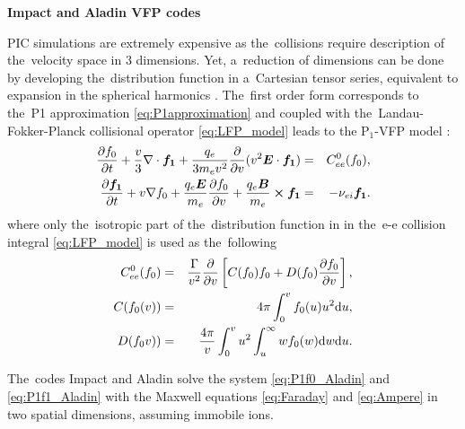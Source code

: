 \textbf{Impact and Aladin VFP codes}

PIC simulations are extremely expensive as the~collisions require description 
of the~velocity space in 3 dimensions. Yet, a~reduction of dimensions can be 
done by developing the~distribution function in a~Cartesian tensor series, 
equivalent to expansion in the spherical harmonics \cite{Johnston_PR1960}.
The~first order form corresponds to the~P1 approximation 
\eqref{eq:P1approximation} and coupled with
the~Landau-Fokker-Planck collisional operator 
\eqref{eq:LFP_model} leads to the P$_1$-VFP model 
\cite{Johnston_PR1960, Kingham_JCP2004}:
\begin{eqnarray}
\frac{\partial f_0}{\partial t}+\frac{v}{3}\nabla \cdot {\boldsymbol{f_1}}
+\frac{q_e}{3m_ev^2}\frac{\partial}{\partial v}(v^2\boldsymbol{E}\cdot {\boldsymbol{f_1}})
&=&
C^0_{ee}(f_0) ,
 \label{eq:P1f0_Aladin}\\
\frac{\partial {\boldsymbol{f_1}}}{\partial t}+v\nabla f_0
+ \frac{q_e\boldsymbol{E}}{m_e}\frac{\partial f_0}{\partial v}
+\frac{q_e\boldsymbol{B}}{m_e}\boldsymbol{\times} {\boldsymbol{f_1}} 
&=&
- \nu_{ei}{\boldsymbol{f_1}} .
\label{eq:P1f1_Aladin}
\end{eqnarray}
where only the~isotropic part of the~distribution function in 
in the~e-e collision integral \eqref{eq:LFP_model} is used as the~following
\begin{eqnarray} 
C^0_{ee}(f_0) &=& \frac{\Gamma}{v^2}\frac{\partial}{\partial v}
\left[C(f_0)f_0+D(f_0)\frac{\partial f_0}{\partial v}\right] ,
\label{eq:C0_collision_operator}
\\
C(f_0(v)) &=& 4\pi\int_0^v f_0(u) u^2 \text{d} u ,
\nonumber
\\
D(f_0v)) &=& \frac{4\pi}{v}\int_0^v u^2\int_u^\infty w f_0(w) 
\text{d} w \text{d} u .
\nonumber
\end{eqnarray}

The~codes Impact and Aladin solve the system \eqref{eq:P1f0_Aladin} 
and \eqref{eq:P1f1_Aladin} with the Maxwell equations  
\eqref{eq:Faraday} and \eqref{eq:Ampere} in two spatial dimensions, 
assuming immobile ions.

